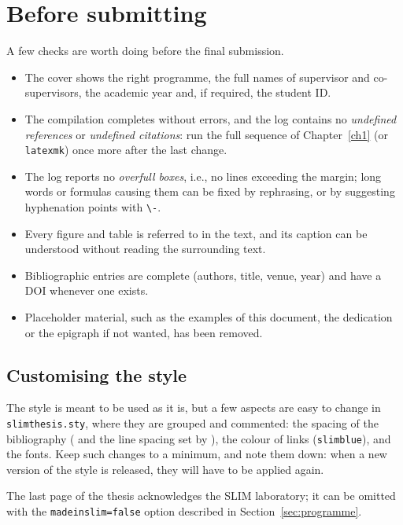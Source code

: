 \chapter{Before submitting} \label{ch:conclusions}

A few checks are worth doing before the final submission.

\begin{itemize}
  \item The cover shows the right programme, the full names of supervisor
    and co-supervisors, the academic year and, if required, the student ID.
  \item The compilation completes without errors, and the log contains no
    \emph{undefined references} or \emph{undefined citations}: run the full
    sequence of Chapter~\ref{ch1} (or \texttt{latexmk}) once more after the
    last change.
  \item The log reports no \emph{overfull boxes}, i.e., no lines exceeding
    the margin; long words or formulas causing them can be fixed by
    rephrasing, or by suggesting hyphenation points with \verb|\-|.
  \item Every figure and table is referred to in the text, and its caption
    can be understood without reading the surrounding text.
  \item Bibliographic entries are complete (authors, title, venue, year) and
    have a DOI whenever one exists.
  \item Placeholder material, such as the examples of this document, the
    dedication or the epigraph if not wanted, has been removed.
\end{itemize}

\section*{Customising the style}

The style is meant to be used as it is, but a few aspects are easy to
change in \texttt{slimthesis.sty}, where they are grouped and commented:
the spacing of the bibliography ( and the line spacing set by
), the colour of links (\texttt{slimblue}), and the
fonts. Keep such changes to a minimum, and note them down: when a new
version of the style is released, they will have to be applied again.

The last page of the thesis acknowledges the SLIM laboratory; it can be
omitted with the \texttt{madeinslim=false} option described in
Section~\ref{sec:programme}.
